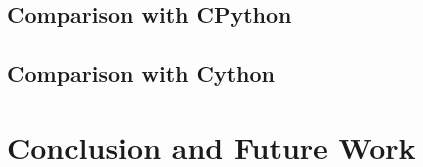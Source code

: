 \documentclass{llncs}
\begin{document}
\subsection{Comparison with CPython}

\subsection{Comparison with Cython}

\section{Conclusion and Future Work}



\end{document}
